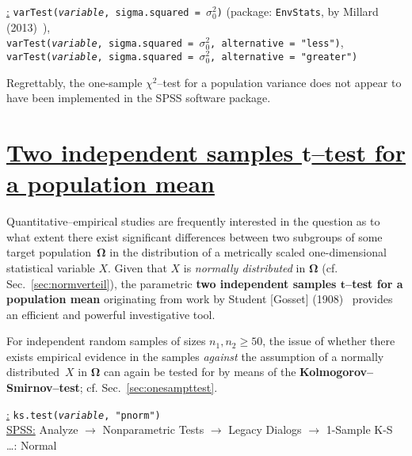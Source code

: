 \medskip
\noindent
\underline{\R:} \texttt{varTest(\textit{variable},
sigma.squared = $\sigma_{0}^{2}$)} (package: \texttt{EnvStats},
by Millard (2013)~), \\
\texttt{varTest(\textit{variable},
sigma.squared = $\sigma_{0}^{2}$, alternative = "less")}, \\
\texttt{varTest(\textit{variable},
sigma.squared = $\sigma_{0}^{2}$, alternative = "greater")}

\medskip
\noindent
Regrettably, the one-sample $\chi^{2}$--test for a population 
variance does not appear to have been implemented in the SPSS 
software package.


\section[Independent samples $t$--test for a mean]{\href{https://www.youtube.com/watch?v=3alSVL8oVMM}{Two independent samples
$\boldsymbol{t}$--test for a population mean}}
Quantitative--empirical studies are frequently interested 
in the question as to what extent there exist significant 
differences between two subgroups of some target 
population~$\boldsymbol{\Omega}$ in 
the distribution of a metrically scaled one-dimensional 
statistical variable $X$. Given that $X$ is \textit{normally 
distributed} in $\boldsymbol{\Omega}$ 
(cf. Sec.~\ref{sec:normverteil}), the parametric \textbf{two 
independent samples $\boldsymbol{t}$--test 
for a population mean} originating from work by Student [Gosset] 
(1908)~ provides an efficient and powerful 
investigative tool.

\medskip
\noindent
For independent random samples of sizes $n_{1}, n_{2} \geq 50$,
the issue of whether there exists empirical evidence in the 
samples \textit{against} the assumption of a normally 
distributed~$X$ in  $\boldsymbol{\Omega}$ can again be tested for 
by means of the \textbf{Kolmogorov--Smirnov--test}; cf. 
Sec.~\ref{sec:onesampttest}.

\medskip
\noindent
\underline{\R:} \texttt{ks.test(\textit{variable}, "pnorm")} \\
\underline{SPSS:} Analyze $\rightarrow$ Nonparametric Tests
$\rightarrow$ Legacy Dialogs $\rightarrow$ 1-Sample K-S \ldots: 
Normal

